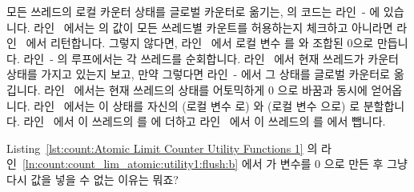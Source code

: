 \begin{lineref}
\begin{lineref}
모든 쓰레드의 로컬 카운터 상태를 글로벌 카운터로 옮기는,
 의 코드는 라인~- 에 있습니다.
라인~ 에서는  의 값이 모든 쓰레드별 카운트를
허용하는지 체크하고 아니라면 라인~ 에서 리턴합니다.
그렇지 않다면, 라인~ 에서 로컬 변수  를 
와  조합된 0으로 만듭니다.
라인~- 의 루프에서는 각 쓰레드를 순회합니다.
라인~ 에서 현재 쓰레드가 카운터 상태를 가지고 있는지 보고, 만약
그렇다면 라인~- 에서 그 상태를 글로벌 카운터로
옮깁니다.
라인~ 에서는 현재 쓰레드의 상태를 어토믹하게 0 으로 바꿈과
동시에 얻어옵니다.
라인~ 에서는 이 상태를 자신의  (로컬 변수  로)
와  (로컬 변수  으로) 로 분할합니다.
라인~ 에서 이 쓰레드의  를  에 더하고
라인~ 에서 이 쓰레드의  를  에서
뺍니다.

\end{lineref}

\QuickQuiz{}
	Listing~\ref{lst:count:Atomic Limit Counter Utility Functions 1} 의
	라인~\ref{ln:count:count_lim_atomic:utility1:flush:b} 에서
	 가  변수를 0 으로 만든 후 그냥
	다시 값을 넣을 수 없는 이유는 뭐죠?
	\iffalse


\end{lineref}
